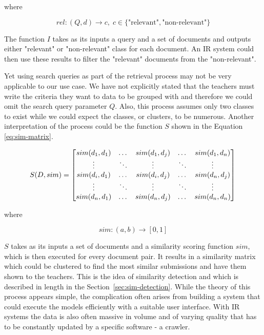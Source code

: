 where
\vspace{-12pt}

$$rel: (Q,d) \rightarrow c,\; c \in \{\text{"relevant"}, \text{"non-relevant"}\}$$
\vspace{-6pt}

The function $I$ takes as its inputs a query and a set of documents and outputs either "relevant" or "non-relevant" class for each document. An IR system could then use these results to filter the "relevant" documents from the "non-relevant".

Yet using search queries as part of the retrieval process may not be very applicable to our use case. We have not explicitly stated that the teachers must write the criteria they want to data to be grouped with and therefore we could omit the search query parameter $Q$. Also, this process assumes only two classes to exist while we could expect the classes, or clusters, to be numerous. Another interpretation of the process could be the function $S$ shown in the Equation \ref{eq:sim-matrix}.

\begin{equation}
\label{eq:sim-matrix}
S(D,sim)=
\begin{bmatrix}
    sim(d_1, d_1) & \dots & sim(d_1, d_j) & \dots & sim(d_1, d_n) \\
    \vdots & \ddots & \vdots & \ddots & \vdots \\
   sim(d_i, d_1) & \dots & sim(d_i, d_j) & \dots & sim(d_n, d_j) \\
    \vdots & \ddots & \vdots & \ddots & \vdots \\
    sim(d_n, d_1) & \dots & sim(d_n, d_j) & \dots & sim(d_n, d_n)
\end{bmatrix} \\
\medskip
\end{equation}

where
\vspace{-12pt}

$$sim : (a, b) \rightarrow [0,1]$$
\vspace{-6pt}

$S$ takes as its inputs a set of documents and a similarity scoring function $sim$, which is then executed for every document pair. It results in a similarity matrix which could be clustered to find the most similar submissions and have them shown to the teachers. This is the idea of similarity detection and which is described in length in the Section~\ref{sec:sim-detection}. While the theory of this process appears simple, the complication often arises from building a system that could execute the models efficiently with a suitable user interface. With IR systems the data is also often massive in volume and of varying quality that has to be constantly updated by a specific software - a crawler.

